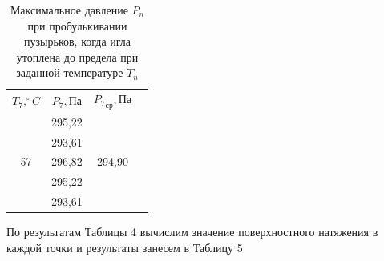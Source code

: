 \documentclass[a4paper,12pt]{article}
\theoremstyle{plain} %
\theoremstyle{definition} %
\theoremstyle{remark} %
\begin{document}
\begin{table}[H]
\begin{center}
\begin{tabular}{|c|c|c||c|c|c||c|c|c|}
			$T_7, ^{\circ} C$    & $P_7, \text{Па}$      & ${P_7}_\text{ср}, \text{Па}$ &\multicolumn{6}{c}{} \\ \cline{1-3}
			\multirow{5}{*}{57} & 295,22 & \multirow{5}{*}{294,90} & \multicolumn{6}{c}{} \\ \cline{2-2}
			& 293,61 & &\multicolumn{6}{c}{}       \\ \cline{2-2}
			& 296,82  &  &\multicolumn{6}{c}{}      \\ \cline{2-2}
			& 295,22 &  &\multicolumn{6}{c}{}      \\ \cline{2-2}
			& 293,61 &   &\multicolumn{6}{c}{}     \\ \cline{1-3}
		\end{tabular}
			\captionsetup{justification=centering}
	\caption{Максимальное давление $P_n$ при пробулькивании пузырьков, когда игла утоплена до предела при заданной температуре $T_n$}
		\end{center}
	\end{table}
По результатам Таблицы 4 вычислим значение поверхностного натяжения в каждой точки и результаты занесем в Таблицу 5
\end{document}
